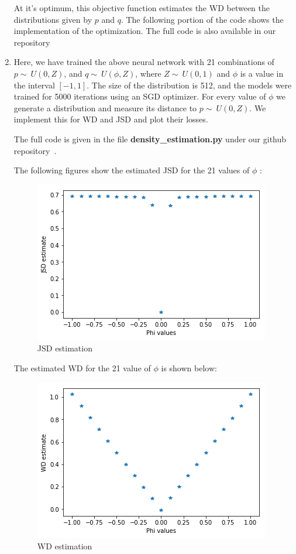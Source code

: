 \begin{enumerate}
	 At it's optimum, this objective function estimates the WD between the distributions given by $p$ and $q$.
%	
	The following portion of the code shows the implementation of the optimization. The full code is also available in our repository~\cite{github}
	
	
	
	\item Here, we have trained the above neural network with 21 combinations of $p\sim~U(0,Z)$, and $q\sim~U(\phi,Z)$, where $Z\sim~U(0,1)$ and $\phi$ is a value in the interval $[-1,1]$. The size of the distribution is 512, and the models were trained for 5000 iterations using an SGD optimizer. For every value of $\phi$ we generate a distribution and measure its distance to $p\sim~U(0,Z)$. We implement this for WD and JSD and plot their losses. 
	
	The full code is given in the file \textbf{density\_estimation.py} under our github repository~\cite{github}.
	
	The following figures show the estimated JSD for the 21 values of $\phi$ :
	\begin{figure}[H]
		\centering
		\includegraphics[scale=0.8]{jsd.png}
		\caption{JSD estimation}
		\label{fig:jsd}
	\end{figure}
	
	The estimated WD for the 21 value of $\phi$ is shown below:
	\begin{figure}[H]
		\centering
		\includegraphics[scale=0.8]{wd.png}
		\caption{WD estimation}
		\label{fig:wd}
	\end{figure}


\end{enumerate}
